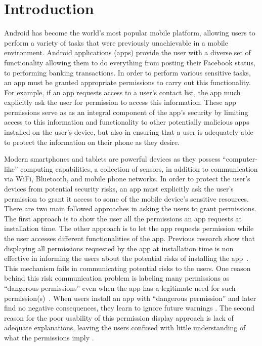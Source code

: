 \documentclass{sig-alternate-05-2015}
\begin{document}


\section{Introduction}
Android has become the world's most popular mobile platform, allowing
users to perform a variety of tasks that were previously unachievable
in a mobile environment. Android applications (apps) provide the user
with a diverse set of functionality allowing them to do everything
from posting their Facebook status, to performing banking
transactions. In order to perform various sensitive tasks, an app must
be granted appropriate permissions to carry out this functionality.
For example, if an app requests access to a user's contact list, the
app much explicitly ask the user for permission to access this
information. These app permissions serve as as an integral component
of the app's security by limiting access to this information and
functionality to other potentially malicious apps installed on the
user's device, but also in ensuring that a user is adequately able to
protect the information on their phone as they desire.


Modern smartphones and tablets are powerful devices as they possess ``computer-like'' computing capabilities, a collection of sensors, in addition to communication via WiFi, Bluetooth, and mobile phone networks. In order to protect the user's devices from potential security risks, an app must explicitly ask the user's permission to grant it access to some of the mobile device's sensitive resources. There are two main followed approaches in asking the users to grant permissions. The first approach is to  show the user all the permissions an app requests at installation time.  The other approach is to let the app requests permission while the user accesses different functionalities of the app. Previous research show that displaying all permissions requested by the app at installation time is non effective in informing the users about the potential risks of installing the app~\cite{Liu:2014:RMA:2566486.2568035, felt2011effectiveness}. This mechanism fails in communicating potential risks to the users. One reason behind this risk communication problem is labeling many permissions as ``dangerous permissions'' even when the app has a legitimate need for such permission(s)~\cite{sarma2012android}. When users install an app with ``dangerous permission'' and later find no negative consequences, they learn to ignore future warnings \cite{stewart1994intended, magat1988consumer}.  The second reason for the poor usability of this permission display approach is lack of adequate explanations, leaving the users confused with little understanding of what the permissions imply \cite{Felt:2012:APU:2335356.2335360, Kelley:2012:CPI:2426020.2426027}.
\end{document}
